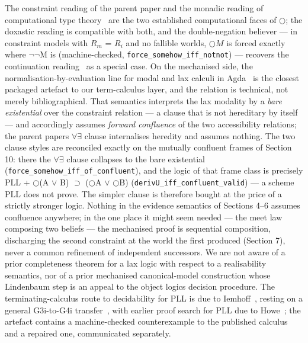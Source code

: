 The constraint reading of the parent paper and the monadic reading of
computational type theory~\cite{Moggi1991,BentonBiermanDePaiva1998} are
the two established computational faces
of \ensuremath{\bigcirc}; the doxastic reading is compatible with both, and the
double-negation believer --- in constraint models with \ensuremath{R_{m}} = \ensuremath{R_{i}} and no
fallible worlds, \ensuremath{\bigcirc M} is forced exactly where \ensuremath{\lnot\lnot}M is (machine-checked,
\texttt{force\_somehow\_iff\_notnot}) --- recovers the continuation reading~\cite{Krivine2009} as a
special case. On the mechanised side, the normalisation-by-evaluation
line for modal and lax calculi in
Agda~\cite{ValliappanRuchTomeCortinas2022,Valliappan2026} is the
closest packaged artefact to our term-calculus layer, and the relation
is technical, not merely bibliographical. That semantics interprets
the lax modality by a \emph{bare existential} over the constraint
relation --- a clause that is not hereditary by itself --- and
accordingly assumes \emph{forward confluence} of the two accessibility
relations; the parent paper\textquotesingle s \ensuremath{\forall\exists} clause
internalises heredity and assumes nothing. The two clause styles are
reconciled exactly on the mutually confluent frames of Section 10:
there the \ensuremath{\forall\exists} clause collapses to the bare
existential (\texttt{force\_somehow\_iff\_of\_confluent}), and the
logic of that frame class is precisely PLL +
\ensuremath{\bigcirc}(A \ensuremath{\vee} B) \ensuremath{\supset}
(\ensuremath{\bigcirc}A \ensuremath{\vee} \ensuremath{\bigcirc}B)
(\texttt{derivU\_iff\_confluent\_valid}) --- a scheme PLL does not
prove. The simpler clause is therefore bought at the price of a
strictly stronger logic. Nothing in the evidence semantics of
Sections 4--6 assumes confluence anywhere; in the one place it might
seem needed --- the meet law composing two beliefs --- the mechanised
proof is sequential composition, discharging the second constraint at
the world the first produced (Section 7), never a common refinement of
independent successors. We are not aware
of a prior completeness theorem for a
lax logic with respect to a realisability semantics, nor of a prior
mechanised canonical-model construction whose Lindenbaum step is an
appeal to the object logic\textquotesingle s decision procedure. The
terminating-calculus route to decidability for PLL is due to
Iemhoff~\cite{Iemhoff2024}, resting on a general G3i-to-G4i
transfer~\cite{Iemhoff2022}, with earlier proof search for PLL due to
Howe~\cite{Howe2001}; the artefact contains a machine-checked
counterexample to the published calculus and a repaired one,
communicated separately.

